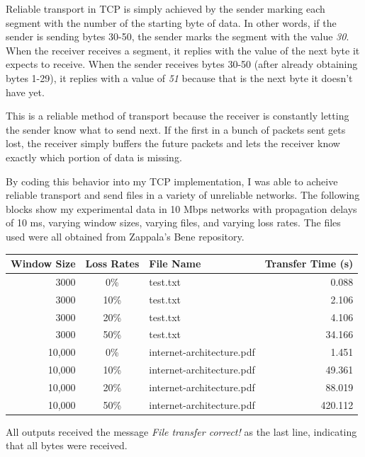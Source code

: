 \documentclass[11pt]{article}
\begin{document}
Reliable transport in TCP is simply achieved by the sender marking each segment with the number of the starting byte of data. In other words, if the sender is sending bytes 30-50, the sender marks the segment with the value \emph{30}. When the receiver receives a segment, it replies with the value of the next byte it expects to receive. When the sender receives bytes 30-50 (after already obtaining bytes 1-29), it replies with a value of \emph{51} because that is the next byte it doesn't have yet. 

This is a reliable method of transport because the receiver is constantly letting the sender know what to send next. If the first in a bunch of packets sent gets lost, the receiver simply buffers the future packets and lets the receiver know exactly which portion of data is missing.

By coding this behavior into my TCP implementation, I was able to acheive reliable transport and send files in a variety of unreliable networks. The following blocks show my experimental data in 10 Mbps networks with propagation delays of 10 ms, varying window sizes, varying files, and varying loss rates. The files used were all obtained from Zappala's Bene repository.

\vspace{0.5cm}
\begin{absolutelynopagebreak}
\begin{tabular}{rclr}
  \toprule
  Window Size & Loss Rates & File Name & Transfer Time (s) \\
  \midrule
  3000 &  0\% & test.txt &  0.088 \\
  3000 & 10\% & test.txt &  2.106 \\
  3000 & 20\% & test.txt &  4.106 \\
  3000 & 50\% & test.txt & 34.166 \\

  10,000 &  0\% & internet-architecture.pdf &   1.451 \\
  10,000 & 10\% & internet-architecture.pdf &  49.361 \\
  10,000 & 20\% & internet-architecture.pdf &  88.019 \\
  10,000 & 50\% & internet-architecture.pdf & 420.112 \\
  \bottomrule
\end{tabular}
\end{absolutelynopagebreak}
\vspace{0.5cm}

All outputs received the message \emph{File transfer correct!} as the last line, indicating that all bytes were received.
\end{document}
